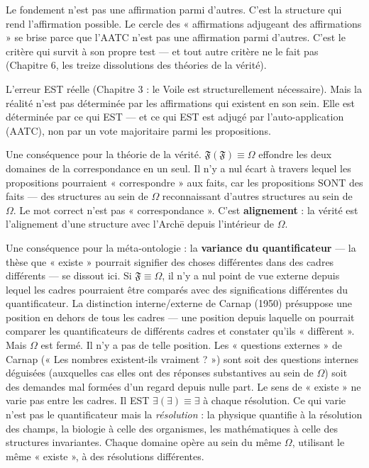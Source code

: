 \documentclass[10pt, openany, oneside]{book}
\begin{document}
Le fondement n'est pas une affirmation parmi d'autres. C'est la structure qui rend l'affirmation possible. Le cercle des « affirmations adjugeant des affirmations » se brise parce que l'AATC n'est pas une affirmation parmi d'autres. C'est le critère qui survit à son propre test --- et tout autre critère ne le fait pas (Chapitre 6, les treize dissolutions des théories de la vérité).

L'erreur EST réelle (Chapitre 3 : le Voile est structurellement nécessaire). Mais la réalité n'est pas déterminée par les affirmations qui existent en son sein. Elle est déterminée par ce qui EST --- et ce qui EST est adjugé par l'auto-application (AATC), non par un vote majoritaire parmi les propositions.

Une conséquence pour la théorie de la vérité. $\mathfrak{F}(\mathfrak{F}) \equiv \Omega$ effondre les deux domaines de la correspondance en un seul. Il n'y a nul écart à travers lequel les propositions pourraient « correspondre » aux faits, car les propositions SONT des faits --- des structures au sein de $\Omega$ reconnaissant d'autres structures au sein de $\Omega$. Le mot correct n'est pas « correspondance ». C'est \textbf{alignement} : la vérité est l'alignement d'une structure avec l'Arch\={e} depuis l'intérieur de $\Omega$.

Une conséquence pour la méta-ontologie : la \textbf{variance du quantificateur} --- la thèse que « existe » pourrait signifier des choses différentes dans des cadres différents --- se dissout ici. Si $\mathfrak{F} \equiv \Omega$, il n'y a nul point de vue externe depuis lequel les cadres pourraient être comparés avec des significations différentes du quantificateur. La distinction interne/externe de Carnap (1950) présuppose une position en dehors de tous les cadres --- une position depuis laquelle on pourrait comparer les quantificateurs de différents cadres et constater qu'ils « diffèrent ». Mais $\Omega$ est fermé. Il n'y a pas de telle position. Les « questions externes » de Carnap (« Les nombres existent-ils vraiment ? ») sont soit des questions internes déguisées (auxquelles cas elles ont des réponses substantives au sein de $\Omega$) soit des demandes mal formées d'un regard depuis nulle part. Le sens de « existe » ne varie pas entre les cadres. Il EST $\exists(\exists) \equiv \exists$ à chaque résolution. Ce qui varie n'est pas le quantificateur mais la \textit{résolution} : la physique quantifie à la résolution des champs, la biologie à celle des organismes, les mathématiques à celle des structures invariantes. Chaque domaine opère au sein du même $\Omega$, utilisant le même « existe », à des résolutions différentes.
\end{document}
